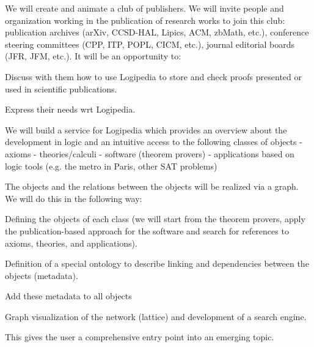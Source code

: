 \begin{workpackage}[id=dissemination,type=MGT,
  short={Dissemination, communication and exploitation},
  title={Dissemination, communication and exploitation},
  lead=Inr]
\begin{tasklist}
\begin{task}[id=teachers-club,
      title=Expanding the use of Logipedia in education,
      lead=Str,StrRM=2,wphases=7-42!.05]
  \end{task}

  \begin{task}[id=publishers-club,
      title=Expanding the use of Logipedia in publishing,
      lead=Zib,ZibRM=2,wphases=7-42!.05]
    We will create and animate a club of publishers. We will invite
    people and organization working in the publication of research
    works to join this club: publication archives (arXiv, CCSD-HAL,
    Lipics, ACM, zbMath, etc.), conference steering committees (CPP,
    ITP, POPL, CICM, etc.), journal editorial boards (JFR, JFM,
    etc.). It will be an opportunity to:
    \begin{compactitem}
    \item Discuss with them how to use Logipedia to store and check
      proofs presented or used in scientific publications.
    \item Express their needs wrt Logipedia.
    \end{compactitem}
  \end{task}

  \begin{task}[id=zib,
      title=Linking scientific publications to Logipedia,
      lead=Zib,ZibRM=12,wphases=12-23]
    We will build a service for Logipedia which provides an overview
    about the development in logic and an intuitive access to the
    following classes of objects - axioms - theories/calculi -
    software (theorem provers) - applications based on logic tools
    (e.g. the metro in Paris, other SAT problems)

    The objects and the relations between the objects will be
    realized via a graph. We will do this in the following way:
    \begin{compactitem}
    \item Defining the objects of each class (we will start from the
      theorem provers, apply the publication-based approach for the
      software and search for references to axioms, theories, and
      applications).
    \item Definition of a special ontology to describe linking and
      dependencies between the objects (metadata).
    \item Add these metadata to all objects
    \item Graph visualization of the network (lattice) and development
      of a search engine.
    \end{compactitem}
    This gives the user a comprehensive entry point into an emerging
    topic.
  \end{task}


\end{tasklist}
\end{workpackage}
